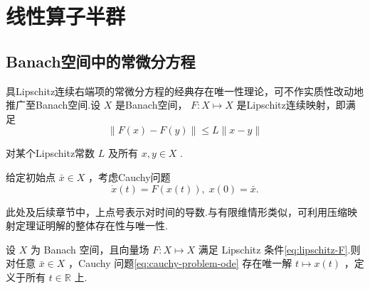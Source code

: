\chapter{线性算子半群}\vspace{-2em}

\section{Banach空间中的常微分方程}

具Lipschitz连续右端项的常微分方程的经典存在唯一性理论，可不作实质性改动地推广至Banach空间.设 $X$ 是Banach空间， $F : X \mapsto  X$ 是Lipschitz连续映射，即满足
\begin{equation}\tag{7.1}\label{eq:lipschitz-F}
\| F\left( x\right)  - F\left( y\right) \|  \leq  L\| x - y\|
\end{equation}

对某个Lipschitz常数 $L$ 及所有 $x,y \in  X$ .

给定初始点 $\bar{x} \in  X$ ，考虑Cauchy问题
\begin{equation}\tag{7.2}\label{eq:cauchy-problem-ode}
\dot{x}\left( t\right)  = F\left( {x\left( t\right) }\right) ,\;x\left( 0\right)  = \bar{x}.
\end{equation}

此处及后续章节中，上点号表示对时间的导数.与有限维情形类似，可利用压缩映射定理证明解的整体存在性与唯一性.
\begin{theorem}[Lipschitz连续右端项常微分方程Cauchy问题解的存在唯一性]\label{thm:lipschitz-ode-existence-uniqueness}
设 $X$ 为 Banach 空间，且向量场 $F : X \mapsto  X$ 满足 Lipschitz 条件\eqref{eq:lipschitz-F}.则对任意 $\bar{x} \in  X$ ，Cauchy 问题\eqref{eq:cauchy-problem-ode} 存在唯一解 $t \mapsto  x\left( t\right)$ ，定义于所有 $t \in  \mathbb{R}$ 上.
\end{theorem}

